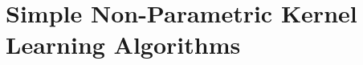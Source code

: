 \newcommand {\LLower}[1]{\smash{\lower 3ex \hbox{#1}}}
\newcommand {\Lower}[1]{\smash{\lower 1.5ex \hbox{#1}}}
\newcommand {\SLower}[1]{\smash{\lower 0.5ex \hbox{#1}}}

\def\XX{{\cal X}}
\def\SS{{\cal S}}
\def\DD{{\cal D}}
\def\a{{\alpha}}
\def\b{{\beta}}
\def\ba{{\bm{\alpha}}}
\def\bb{{\bm{\beta}}}
\def\y{{\bf y}}
\def\I{{\bf I}}
\def\B{{\bf B}}
\def\A{{\bf A}}
\def\x{{\bf x}}
\def\K{{\bf K}}
\def\L{{\bf L}}
\def\S{{\bf S}}
\def\C{{\bf C}}
\def\D{{\bf D}}
\def\E{{\bf E}}
\def\P{{\bf P}}
\def\T{{\bf T}}
\def\bsigma{\mbox{\boldmath $\sigma$}}
\def\blambda{\mbox{\boldmath $\lambda$}}
\def\bmu{\mbox{\boldmath $\mu$}}
\def\V{{\bf V}}
\def\0{{\bf 0}}
\def\1{{\bf 1}}
\def\v{{\bf v}}
\def\tr{{\mbox{tr}\;}}
\def\diag{{\mbox{diag}}}
\def\st{{\mbox{s.t.}}}
\def\psd{{\succeq\0}}
\def\pd{{\succ\0}}
\def\Z{{\bf Z}}
\def\J{J}
\def\rk{{\mbox{r}}}

\newcommand{\dataset}{{\cal D}}
\newcommand{\fracpartial}[2]{\frac{\partial #1}{\partial  #2}}


\chapter{Simple Non-Parametric Kernel Learning Algorithms}\label{chp:npkl}


